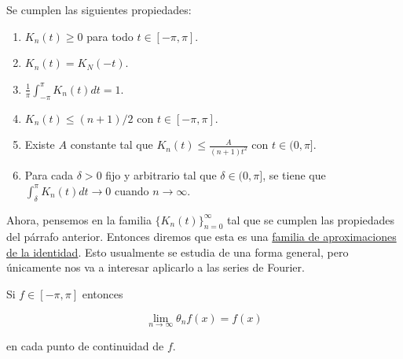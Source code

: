 \begin{aco}
    Se cumplen las siguientes propiedades:

    \begin{enumerate}
        \item $K_n(t) \geq 0$ para todo $t \in [-\pi, \pi]$.
        \item $K_n(t) = K_N(-t)$.
        \item $\frac{1}{\pi} \int_{-\pi}^{\pi} K_n(t)dt = 1$.
        \item $K_n(t) \leq (n+1) / 2$ con $t \in [-\pi,\pi]$.
        \item Existe $A$ constante tal que $K_n(t) \leq \frac{A}{(n+1)t^2}$ con $t \in (0,\pi]$.
        \item Para cada $\delta > 0$ fijo y arbitrario tal que $\delta \in (0, \pi]$, se tiene que $\int_{\delta}^{\pi} K_n(t)dt \to 0$ cuando $n \to \infty$.
    \end{enumerate}
\end{aco}

Ahora, pensemos en la familia $\{ K_n(t) \}_{n=0}^{\infty}$ tal que se cumplen las propiedades del párrafo anterior. Entonces diremos que esta es una \ul{familia de aproximaciones de la identidad}. Esto usualmente se estudia de una forma general, pero únicamente nos va a interesar aplicarlo a las series de Fourier.

\begin{teo}
    Si $f \in [-\pi, \pi]$ entonces

    \[
        \lim_{n \to \infty} \theta_n f(x) = f(x)
    \]

    en cada punto de continuidad de $f$.
\end{teo}

